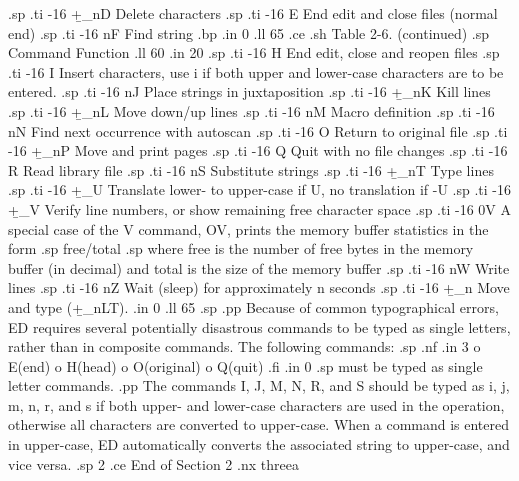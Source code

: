 $$.sp
.ti -16
  +\b_nD           Delete characters
.sp
.ti -16
  E             End edit and close files (normal end)
.sp
.ti -16
  nF            Find string
.bp
.in 0
.ll 65
.ce
.sh
Table 2-6.  (continued)
.sp
    Command                        Function
.ll 60
.in 20
.sp
.ti -16
  H             End edit, close and reopen files
.sp
.ti -16
  I             Insert characters, use i if both upper
and lower-case characters are to be entered.
.sp
.ti -16
  nJ            Place strings in juxtaposition
.sp
.ti -16
  +\b_nK           Kill lines
.sp
.ti -16
  +\b_nL           Move down/up lines
.sp
.ti -16
  nM            Macro definition
.sp
.ti -16
  nN            Find next occurrence with autoscan
.sp
.ti -16
  O             Return to original file
.sp
.ti -16
  +\b_nP           Move and print pages
.sp
.ti -16
  Q             Quit with no file changes
.sp
.ti -16
  R             Read library file
.sp
.ti -16
  nS            Substitute strings
.sp
.ti -16
  +\b_nT           Type lines
.sp
.ti -16
  +\b_U            Translate lower- to upper-case if U, 
no translation if -U
.sp
.ti -16
  +\b_V            Verify line numbers, or show 
remaining free character space
.sp
.ti -16
  0V            A special case of the V command, OV, 
prints the memory buffer statistics in the form
.sp
free/total
.sp
where free is the number of free bytes in the memory buffer (in 
decimal) and total is the size of the memory buffer
.sp
.ti -16
  nW            Write lines
.sp
.ti -16
  nZ            Wait (sleep) for approximately n 
seconds
.sp
.ti -16
  +\b_n            Move and type (+\b_nLT).
.in 0
.ll 65
.sp
.pp
Because of common typographical errors, ED requires several 
potentially disastrous commands to be typed as single letters, 
rather than in composite commands.  The following commands:
.sp
.nf
.in 3
o E(end)
o H(head)
o O(original)
o Q(quit)
.fi
.in 0
.sp
must be typed as single letter commands.
.pp
The commands I, J, M, N, R, and S should be typed as i, j, m, n, 
r, and s if both upper- and lower-case characters are used in the 
operation, otherwise all characters are converted to upper-case.  
When a command is entered in upper-case, ED automatically 
converts the associated string to upper-case, and vice versa.
.sp 2
.ce
End of Section 2
.nx threea




